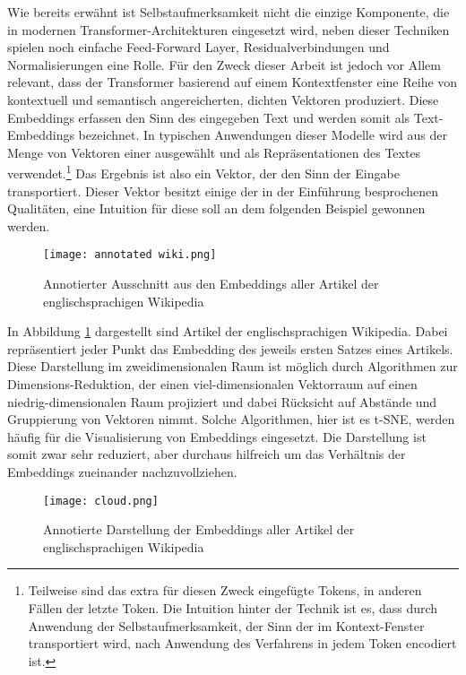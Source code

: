 Wie bereits erwähnt ist Selbstaufmerksamkeit nicht die einzige Komponente, die in modernen Transformer-Architekturen eingesetzt wird, neben dieser Techniken spielen noch einfache Feed-Forward Layer, Residualverbindungen und Normalisierungen eine Rolle. Für den Zweck dieser Arbeit ist jedoch vor Allem relevant, dass der Transformer basierend auf einem Kontextfenster eine Reihe von kontextuell und semantisch angereicherten, dichten Vektoren produziert. Diese Embeddings erfassen den Sinn des eingegeben Text und werden somit als Text-Embeddings bezeichnet. In typischen Anwendungen dieser Modelle wird aus der Menge von Vektoren einer ausgewählt und als Repräsentationen des Textes verwendet.\footnote{Teilweise sind das extra für diesen Zweck eingefügte Tokens, in anderen Fällen der letzte Token. Die Intuition hinter der Technik ist es, dass durch Anwendung der Selbstaufmerksamkeit, der Sinn der im Kontext-Fenster transportiert wird, nach Anwendung des Verfahrens in jedem Token encodiert ist. } Das Ergebnis ist also ein Vektor, der den Sinn der Eingabe transportiert. 
Dieser Vektor besitzt einige der in der Einführung besprochenen Qualitäten, eine Intuition für diese soll an dem folgenden Beispiel gewonnen werden.

\begin{figure}[H]
    \centering
    \texttt{[image: annotated wiki.png]}
    \caption{Annotierter Ausschnitt aus den Embeddings aller Artikel der englischsprachigen Wikipedia}
    \label{AusschnittWiki}
\end{figure}

In Abbildung \ref{AusschnittWiki} dargestellt sind Artikel der englischsprachigen Wikipedia. Dabei repräsentiert jeder Punkt das Embedding des jeweils ersten Satzes eines Artikels. Diese Darstellung im zweidimensionalen Raum ist möglich durch Algorithmen zur Dimensions-Reduktion, der einen viel-dimensionalen Vektorraum auf einen niedrig-dimensionalen Raum projiziert und dabei Rücksicht auf Abstände und Gruppierung von Vektoren nimmt. Solche Algorithmen, hier ist es t-SNE, werden häufig für die Visualisierung von Embeddings eingesetzt. Die Darstellung ist somit zwar sehr reduziert, aber durchaus hilfreich um das Verhältnis der Embeddings zueinander nachzuvollziehen. \\


\begin{figure}[H]
    \centering
    \texttt{[image: cloud.png]}
    \caption{Annotierte Darstellung der Embeddings aller Artikel der englischsprachigen Wikipedia}
    \label{WikiEmbeddings}
\end{figure}

